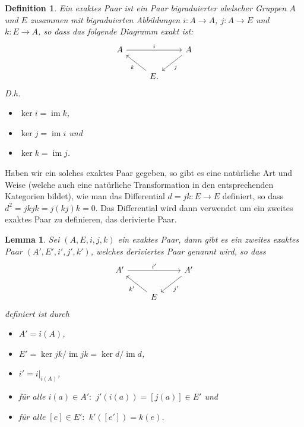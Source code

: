 \documentclass[12pt, hidelinks]{article}
\numberwithin{conj}{section}
\newtheorem{definition}[conj]{Definition}
\newtheorem{lemma}[conj]{Lemma}
\newcommand{\ima}{\operatorname{im}}
\begin{document}
\begin{definition}
    Ein exaktes Paar ist ein Paar bigraduierter abelscher Gruppen $A$ und $E$ zusammen mit bigraduierten Abbildungen $i: A \to A$, $j: A \to E$ und $k: E \to A$, so dass das folgende Diagramm exakt ist:
    \[\begin{tikzcd}
    	A && A \\
    	& E.
    	\arrow["i", from=1-1, to=1-3]
    	\arrow["j", from=1-3, to=2-2]
    	\arrow["k", from=2-2, to=1-1]
    \end{tikzcd}\]
    D.h.
    \begin{itemize}[nolistsep]
        \item $\ker i = \ima k$,
        \item $\ker j = \ima i$ und
        \item $\ker k = \ima j$.
    \end{itemize}
\end{definition}

Haben wir ein solches exaktes Paar gegeben, so gibt es eine natürliche Art und Weise (welche auch eine natürliche Transformation in den entsprechenden Kategorien bildet), wie man das Differential $d = jk: E \to E$ definiert, so dass $d^2 = jkjk = j(kj)k = 0$. Das Differential wird dann verwendet um ein zweites exaktes Paar zu definieren, das derivierte Paar.

\begin{lemma}
    Sei $(A,E,i,j,k)$ ein exaktes Paar, dann gibt es ein zweites exaktes Paar $(A',E',i',j',k')$, welches deriviertes Paar genannt wird, so dass
    \[\begin{tikzcd}
    	A' && A' \\
    	& E
    	\arrow["i'", from=1-1, to=1-3]
    	\arrow["j'", from=1-3, to=2-2]
    	\arrow["k'", from=2-2, to=1-1]
    \end{tikzcd}\]
    definiert ist durch
    \begin{itemize}[nolistsep]
        \item $A' = i(A)$,
        \item $E' = \ker jk / \ima jk = \ker d / \ima d$,
        \item $i' = i\vert_{i(A)}$,
        \item für alle $i(a) \in A':$ $j'(i(a)) = [j(a)] \in E'$ und
        \item für alle $[e] \in E':$ $k'([e']) = k(e)$.
    \end{itemize}
\end{lemma}
\end{document}
